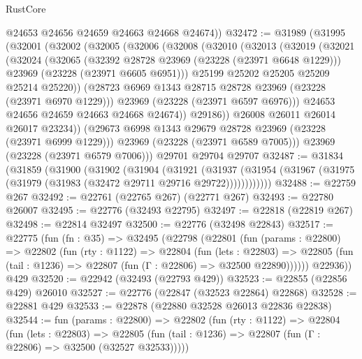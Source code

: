 \begin{lexlean}{RustCore}
\begin{coremodule}
        @24653
        @24656
        @24659
        @24663
        @24668
        @24674))
@32472 := @31989
    (@31995
      (@32001
        (@32002
          (@32005
            (@32006
              (@32008
                (@32010
                  (@32013
                    (@32019
                      (@32021
                        (@32024
                          (@32065
                            (@32392 @28728 @23969 (@23228 (@23971 @6648 @1229)))
                            @23969
                            (@23228 (@23971 @6605 @6951)))
                          @25199
                          @25202
                          @25205
                          @25209
                          @25214
                          @25220))
                      (@28723 @6969 @1343 @28715 @28728 @23969 (@23228 (@23971 @6970 @1229)))
                      @23969
                      (@23228 (@23971 @6597 @6976)))
                    @24653
                    @24656
                    @24659
                    @24663
                    @24668
                    @24674))
                @29186))
            @26008
            @26011
            @26014
            @26017
            @23234))
        (@29673 @6998 @1343 @29679 @28728 @23969 (@23228 (@23971 @6999 @1229)))
        @23969
        (@23228 (@23971 @6589 @7005)))
      @23969
      (@23228 (@23971 @6579 @7006)))
    @29701
    @29704
    @29707
@32487 := @31834
    (@31859
      (@31900
        (@31902
          (@31904
            (@31921
              (@31937
                (@31954 (@31967 (@31975 (@31979 (@31983 (@32472 @29711 @29716 @29722))))))))))))
@32488 := @22759 @267
@32492 := @22761 (@22765 @267) (@22771 @267)
@32493 := @22780 @26007
@32495 := @22776 (@32493 @22795)
@32497 := @22818 (@22819 @267)
@32498 := @22814 @32497
@32500 := @22776 (@32498 @22843)
@32517 := @22775
    (fun (fn : @35) =>
    @32495
      (@22798
        (@22801
          (fun (params : @22800) =>
          @22802
            (fun (rty : @1122) =>
            @22804
              (fun (lets : @22803) =>
              @22805 (fun (tail : @1236) => @22807 (fun (Γ : @22806) => @32500 @22890))))))
        @22936))
    @429
@32520 := @22942 (@32493 (@22793 @429))
@32523 := @22855 (@22856 @429) @26010
@32527 := @22776 (@22847 (@32523 @22864) @22868)
@32528 := @22881 @429
@32533 := @22878 (@22880 @32528 @26013 @22836 @22838)
@32544 := fun (params : @22800) =>
  @22802
    (fun (rty : @1122) =>
    @22804
      (fun (lets : @22803) =>
      @22805 (fun (tail : @1236) => @22807 (fun (Γ : @22806) => @32500 (@32527 @32533)))))

\end{coremodule}
\end{lexlean}
